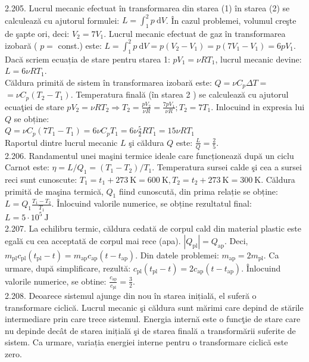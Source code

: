 2.205. Lucrul mecanic efectuat în transformarea din starea (1) în starea (2) se calculează cu ajutorul formulei: $L=\int_{1}^{2} p \mathrm{~d} V$. În cazul problemei, volumul creşte de şapte ori, deci: $V_{2}=7 V_{1}$. Lucrul mecanic efectuat de gaz în transformarea izobară ( $p=$ const.) este: $L=\int_{1}^{2} p \mathrm{~d} V=p\left(V_{2}-V_{1}\right)=p\left(7 V_{1}-V_{1}\right)=6 p V_{1}$. Dacă scriem ecuația de stare pentru starea 1: $p V_{1}=\nu R T_{1}$, lucrul mecanic devine: $L=6 \nu R T_{1}$.\\ Căldura primită de sistem în transformarea izobară este: $Q=\nu C_{p} \Delta T=$ $=\nu C_{p}\left(T_{2}-T_{1}\right)$. Temperatura finală (în starea 2 ) se calculează cu ajutorul ecuaţiei de stare $p V_{2}=\nu R T_{2} \Rightarrow T_{2}=\frac{p V_{2}}{\nu R}=\frac{7 p V_{1}}{\nu R} ; T_{2}=7 T_{1}$. Inlocuind in expresia lui $Q$ se obține:\\ $Q=\nu C_{p}\left(7 T_{1}-T_{1}\right)=6 \nu C_{p} T_{1}=6 \nu \frac{5}{2} R T_{1}=15 \nu R T_{1}$\\ Raportul dintre lucrul mecanic $L$ şi căldura $Q$ este: $\frac{L}{Q}=\frac{2}{5}$.\\

2.206. Randamentul unei maşini termice ideale care funcționează după un ciclu Carnot este: $\eta=L / Q_{1}=\left(T_{1}-T_{2}\right) / T_{1}$. Temperatura sursei calde şi cea a sursei reci sunt cunoscute: $T_{1}=t_{1}+273 \mathrm{~K}=600 \mathrm{~K}, T_{2}=t_{2}+273 \mathrm{~K}=300 \mathrm{~K}$. Căldura primită de maşina termică, $Q_{1}$ fiind cunoscută, din prima relație se obține: $L=Q_{1} \frac{T_{1}-T_{2}}{T_{1}}$. Înlocuind valorile numerice, se obține rezultatul final:\\ $L=5 \cdot 10^{5} \mathrm{~J}$\\

2.207. La echilibru termic, căldura cedată de corpul cald din material plastic este egală cu cea acceptată de corpul mai rece (apa). $\left|Q_{\mathrm{pl}}\right|=Q_{\mathrm{ap}}$. Deci, $m_{\mathrm{pl}} c_{\mathrm{pl}}\left(t_{\mathrm{pl}}-t\right)=m_{\mathrm{ap}} c_{\mathrm{ap}}\left(t-t_{\mathrm{ap}}\right)$. Din datele problemei: $m_{\mathrm{ap}}=2 m_{\mathrm{pl}}$. Ca urmare, după simplificare, rezultă: $c_{\mathrm{pl}}\left(t_{\mathrm{pl}}-t\right)=2 c_{\mathrm{ap}}\left(t-t_{\mathrm{ap}}\right)$. Înlocuind valorile numerice, se obtine: $\frac{c_{\mathrm{ap}}}{c_{\mathrm{pl}}}=\frac{3}{2}$.\\

2.208. Deoarece sistemul ajunge din nou în starea inițială, el suferă o transformare ciclică. Lucrul mecanic şi căldura sunt mărimi care depind de stările intermediare prin care trece sistemul. Energia internă este o funcţie de stare care nu depinde decât de starea inițială şi de starea finală a transformării suferite de sistem. Ca urmare, variația energiei interne pentru o transformare ciclică este zero.\\

